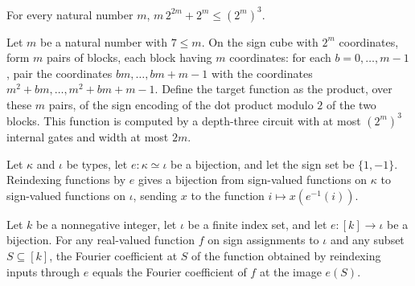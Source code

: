 \begin{theorem}
\label{FABL.ac0ThresholdParityCircuit_size_le_cube}
\leanok
{}
For every natural number $m$, $m\,2^{2m}+2^m\le (2^m)^3$.
\end{theorem}

\begin{theorem}
\label{FABL.hasDepthCircuit_ac0ThresholdParityTarget}
\leanok
{}
Let $m$ be a natural number with $7\le m$. On the sign cube with $2^m$ coordinates, form
$m$ pairs of blocks, each block having $m$ coordinates: for each $b=0,\ldots,m-1$, pair
the coordinates $bm,\ldots,bm+m-1$ with the coordinates $m^2+bm,\ldots,m^2+bm+m-1$.
Define the target function as the product, over these $m$ pairs, of the sign encoding of
the dot product modulo $2$ of the two blocks. This function is computed by a depth-three
circuit with at most $(2^m)^3$ internal gates and width at most $2m$.
\end{theorem}

\begin{definition}
\label{FABL.reindexSignCube}
\leanok
{}
Let $\kappa$ and $\iota$ be types, let $e:\kappa\simeq\iota$ be a bijection, and let the
sign set be $\{1,-1\}$. Reindexing functions by $e$ gives a bijection from sign-valued
functions on $\kappa$ to sign-valued functions on $\iota$, sending $x$ to the function
$i\mapsto x(e^{-1}(i))$.
\end{definition}

\begin{theorem}
\label{FABL.fourierCoeff_reindexSignCube}
\leanok
{}
Let $k$ be a nonnegative integer, let $\iota$ be a finite index set, and let
$e:[k]\to\iota$ be a bijection. For any real-valued function $f$ on sign assignments to
$\iota$ and any subset $S\subseteq[k]$, the Fourier coefficient at $S$ of the function
obtained by reindexing inputs through $e$ equals the Fourier coefficient of $f$ at the
image $e(S)$.
\end{theorem}

